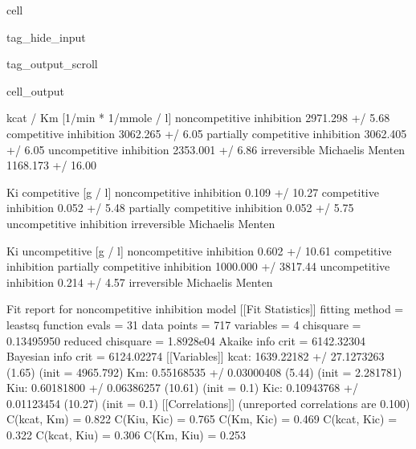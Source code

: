 \documentclass[letterpaper,10pt,english]{jupyterBook}
\begin{document}
\begin{sphinxuseclass}{cell}
\begin{sphinxuseclass}{tag_hide_input}
\begin{sphinxuseclass}{tag_output_scroll}
\begin{sphinxVerbatimOutput}
\begin{sphinxuseclass}{cell_output}
\begin{sphinxVerbatim}[commandchars=\\\{\}]
                                 kcat / Km [1/min * 1/mmole / l]  \PYGZbs{}
non\PYGZhy{}competitive inhibition                    2971.298 +/\PYGZhy{} 5.68\PYGZpc{}   
competitive inhibition                        3062.265 +/\PYGZhy{} 6.05\PYGZpc{}   
partially competitive inhibition              3062.405 +/\PYGZhy{} 6.05\PYGZpc{}   
uncompetitive inhibition                      2353.001 +/\PYGZhy{} 6.86\PYGZpc{}   
irreversible Michaelis Menten                1168.173 +/\PYGZhy{} 16.00\PYGZpc{}   

                                 Ki competitive [g / l]  \PYGZbs{}
non\PYGZhy{}competitive inhibition             0.109 +/\PYGZhy{} 10.27\PYGZpc{}   
competitive inhibition                  0.052 +/\PYGZhy{} 5.48\PYGZpc{}   
partially competitive inhibition        0.052 +/\PYGZhy{} 5.75\PYGZpc{}   
uncompetitive inhibition                              \PYGZhy{}   
irreversible Michaelis Menten                         \PYGZhy{}   

                                 Ki uncompetitive [g / l]  
non\PYGZhy{}competitive inhibition               0.602 +/\PYGZhy{} 10.61\PYGZpc{}  
competitive inhibition                                  \PYGZhy{}  
partially competitive inhibition    1000.000 +/\PYGZhy{} 3817.44\PYGZpc{}  
uncompetitive inhibition                  0.214 +/\PYGZhy{} 4.57\PYGZpc{}  
irreversible Michaelis Menten                           \PYGZhy{}  
\end{sphinxVerbatim}

\begin{sphinxVerbatim}[commandchars=\\\{\}]
Fit report for non\PYGZhy{}competitive inhibition model
[[Fit Statistics]]
    \PYGZsh{} fitting method   = leastsq
    \PYGZsh{} function evals   = 31
    \PYGZsh{} data points      = 717
    \PYGZsh{} variables        = 4
    chi\PYGZhy{}square         = 0.13495950
    reduced chi\PYGZhy{}square = 1.8928e\PYGZhy{}04
    Akaike info crit   = \PYGZhy{}6142.32304
    Bayesian info crit = \PYGZhy{}6124.02274
[[Variables]]
    k\PYGZus{}cat:  1639.22182 +/\PYGZhy{} 27.1273263 (1.65\PYGZpc{}) (init = 4965.792)
    Km:     0.55168535 +/\PYGZhy{} 0.03000408 (5.44\PYGZpc{}) (init = 2.281781)
    K\PYGZus{}iu:   0.60181800 +/\PYGZhy{} 0.06386257 (10.61\PYGZpc{}) (init = 0.1)
    K\PYGZus{}ic:   0.10943768 +/\PYGZhy{} 0.01123454 (10.27\PYGZpc{}) (init = 0.1)
[[Correlations]] (unreported correlations are \PYGZlt{} 0.100)
    C(k\PYGZus{}cat, Km)   = 0.822
    C(K\PYGZus{}iu, K\PYGZus{}ic)  = \PYGZhy{}0.765
    C(Km, K\PYGZus{}ic)    = 0.469
    C(k\PYGZus{}cat, K\PYGZus{}ic) = 0.322
    C(k\PYGZus{}cat, K\PYGZus{}iu) = \PYGZhy{}0.306
    C(Km, K\PYGZus{}iu)    = \PYGZhy{}0.253
\end{sphinxVerbatim}


\end{sphinxuseclass}
\end{sphinxVerbatimOutput}
\end{sphinxuseclass}
\end{sphinxuseclass}
\end{sphinxuseclass}
\end{document}
